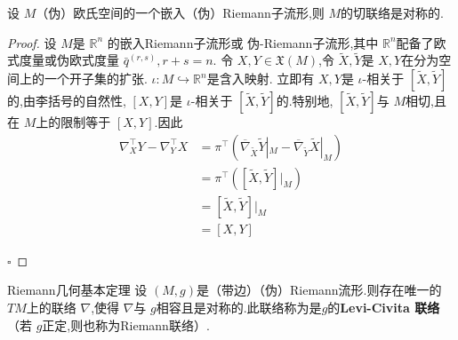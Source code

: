 \documentclass[../../几何与拓扑.tex]{subfiles}
\begin{document}
\begin{proposition}\label{切联络的对称性}
    设 \(  M  \)（伪）欧氏空间的一个嵌入（伪）Riemann子流形,则 \(  M  \)的切联络是对称的.  
\end{proposition}
\begin{proof}
    设 \(  M  \)是 \(  \mathbb{R} ^{n}  \) 的嵌入Riemann子流形或 伪-Riemann子流形,其中 \(  \mathbb{R} ^{n}  \)配备了欧式度量或伪欧式度量 \(  \bar{q}^{\left( r,s \right) },r+ s= n  \).
    令 \(  X,Y  \in \mathfrak{X}\left( M \right) \),令 \(  \tilde{X},\tilde{Y}  \)是 \(  X,Y  \)在分为空间上的一个开子集的扩张. \(  \iota :M \hookrightarrow \mathbb{R} ^{n}  \)是含入映射.
    立即有 \(  X,Y  \)是 \( \iota   \)-相关于 \(  \left[ \tilde{X},\tilde{Y} \right]   \)的,由李括号的自然性, \(  \left[ X,Y \right]   \)是 \(  \iota   \)-相关于 \(  \left[ \tilde{X},\tilde{Y} \right]   \)的.特别地, \(  \left[ \tilde{X},\tilde{Y} \right]   \)与 \(  M  \)相切,且在 \(  M  \)上的限制等于 \(  \left[ X,Y \right]   \).因此 \[
    \begin{aligned}
     \nabla _{X}^{\top}Y- \nabla _{Y}^{\top}X& =   \pi ^{\top}\left( \overline{ \nabla }_{\tilde{X}}\tilde{Y}|_{M}- \overline{ \nabla }_{\tilde{Y}}\tilde{X}|_{M} \right)\\ 
      & =  \pi ^{\top} \left( \left[ \tilde{X},\tilde{Y} \right]|_{M}  \right)\\ 
       & =  \left[ \tilde{X},\tilde{Y} \right]|_{M}\\ 
        & =  \left[ X,Y \right]   
    \end{aligned}
    \]                  

    \hfill $\square$
\end{proof}
\begin{theorem}{Riemann几何基本定理}
    设 \(  \left( M,g \right)   \)是（带边）（伪）Riemann流形.则存在唯一的 \(  TM  \)上的联络 \(   \nabla   \),使得 \(   \nabla   \)与 \(  g  \)相容且是对称的.此联络称为是\(  g  \)的\textbf{Levi-Civita 联络}（若 \(  g  \)正定,则也称为Riemann联络）.      
\end{theorem}
\end{document}

